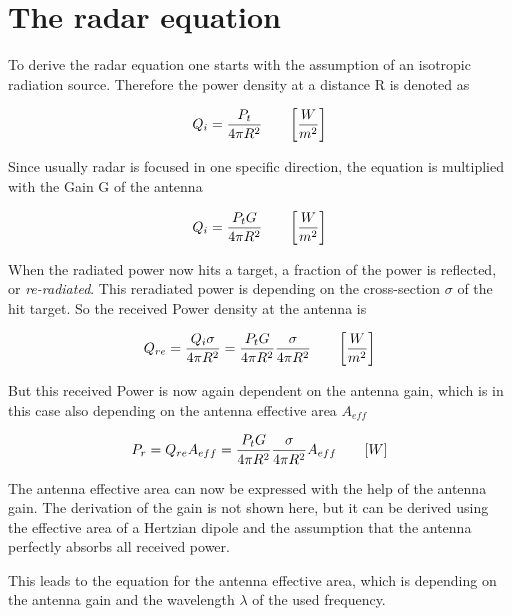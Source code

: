 \section{The radar equation}
To derive the radar equation one starts with the assumption of an isotropic radiation source. Therefore the power density at a distance R is denoted as


\begin{equation}
\label{eq:iso}
	\centering
	Q_{i} = \frac{P_t}{4 \pi R^2} \qquad \bigg[\frac{W}{m^2} \bigg]
\end{equation}

Since usually radar is focused in one specific direction, the equation is multiplied with the Gain G of the antenna

\begin{equation}
\label{eq:dir}
	\centering
	Q_{i} = \frac{P_t G}{4 \pi R^2} \qquad \bigg[\frac{W}{m^2} \bigg]
\end{equation}

When the radiated power now hits a target, a fraction of the power is reflected, or \textit{re-radiated}. This reradiated power is depending on the cross-section $\sigma$ of the hit target. So the received Power density at the antenna is 

\begin{equation}
\label{eq:rePowDen}
	\centering
	Q_{re} = \frac{Q_i \sigma}{4\pi R^2} = \frac{P_t G}{4 \pi R^2} \frac{\sigma}{4\pi R^2} \qquad \bigg[\frac{W}{m^2} \bigg]
\end{equation}

But this received Power is now again dependent on the antenna gain, which is in this case also depending on the antenna effective area $A_{eff}$

\begin{equation}
\label{eq:rePow}
	\centering
	P_{r} = Q_{re} A_{eff} = \frac{P_t G}{4 \pi R^2} \frac{\sigma}{4\pi R^2} A_{eff}\qquad [W]
\end{equation}

The antenna effective area can now be expressed with the help of the antenna gain. The derivation of the gain is not shown here, but it can be derived using the effective area of a Hertzian dipole and the assumption that the antenna perfectly absorbs all received power.\par
This leads to the equation for the antenna effective area, which is depending on the antenna gain and the wavelength $\lambda $ of the used frequency.

